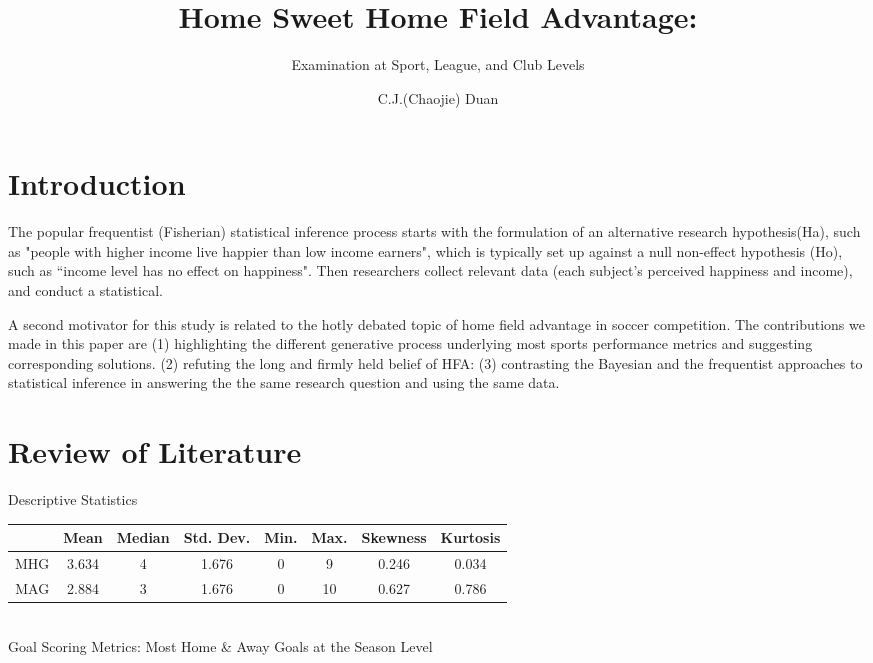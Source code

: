 \documentclass[USenglish]{article}
\begin{document}

  \author*[1]{C.J.(Chaojie) Duan}
  \title{Home Sweet Home Field Advantage:}
  \subtitle{Examination at Sport, League, and Club Levels}
\maketitle

\section{Introduction} 

The popular frequentist (Fisherian) statistical inference process starts with the formulation of an alternative research hypothesis(Ha), such as "people with higher income live happier than low income earners", which is typically set up against a null non-effect hypothesis (Ho), such as ``income level has no effect on happiness". Then researchers collect relevant data (each subject's perceived happiness and income), and conduct a statistical.

A second motivator for this study is related to the hotly debated topic of home field advantage in soccer competition.
The contributions we made in this paper are (1) highlighting the different generative process underlying most sports performance metrics and suggesting corresponding solutions.  (2) refuting the long and firmly held belief of HFA: (3) contrasting the Bayesian and the frequentist approaches to statistical inference in answering the the same research question and using the same data.
 
\section{Review of Literature} 

\begin{table}
Descriptive Statistics\label{Tab1}\\
\begin{tabular}{c|c|c|c|c|c|c|c}
\hline 
 & Mean & Median & Std. Dev. & Min. & Max. & Skewness & Kurtosis \\
\hline 
 MHG & 3.634 & 4 & 1.676 & 0 & 9 & 0.246 & 0.034 \\
\hline 
 MAG & 2.884 & 3 & 1.676 & 0 & 10 & 0.627 & 0.786 \\
\hline 
\end{tabular}
\\
{Goal Scoring Metrics: Most Home \& Away Goals at the Season Level}\\
\end{table}
\end{document}
